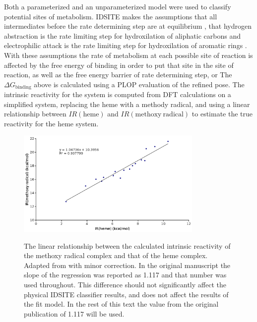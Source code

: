 Both a parameterized and an unparameterized model were used to classify potential sites of metabolism.
IDSITE makes the assumptions that all intermediates before the rate determining step are at equilibrium \cite{wang2007stochastic}, that hydrogen abstraction is the rate limiting step for hydroxilation of aliphatic carbons and electrophilic attack is the rate limiting step for hydroxilation of aromatic rings \cite{guengerich2001common,shaik2005theoretical}.
With these assumptions the rate of metabolism at each possible site of reaction is affected by the free energy of binding in order to put that site in the site of reaction, as well as the free energy barrier of rate determining step, or
The ${\Delta}G_{\mathrm{binding}}$ above is calculated using a PLOP evaluation of the refined pose.
The intrinsic reactivity for the system is computed from DFT calculations on a simplified system, replacing the heme with a methody radical, and using a linear relationship between $IR(\mathrm{heme})$ and $IR(\mathrm{methoxy\ radical})$ to estimate the true reactivity for the heme system.
\begin{figure}[h]
\centering
\includegraphics[width=0.8\textwidth]{figures/idsite/intrinsic_corrected.png}
\label{fig:idsite/intrinsic}
\caption{The linear relationship between the calculated intrinsic reactivity of the methoxy radical complex and that of the heme complex.
Adapted from \protect\cite{li2011idsite} with minor correction.
In the original manuscript the slope of the regression was reported as 1.117 and that number was used throughout.
This difference should not significantly affect the physical IDSITE classifier results, and does not affect the results of the fit model.
In the rest of this text the value from the original publication of 1.117 will be used.}
\end{figure}

